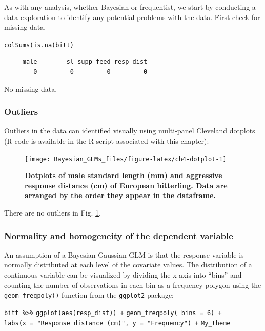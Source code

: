 \documentclass[
]{book}
\begin{document}
As with any analysis, whether Bayesian or frequentist, we start by conducting a data exploration to identify any potential problems with the data. First check for missing data.

\texttt{colSums(is.na(bitt)}

\begin{verbatim}
     male        sl supp_feed resp_dist 
        0         0         0         0 
\end{verbatim}

No missing data.

\hypertarget{outliers-1}{%
\subsubsection{Outliers}\label{outliers-1}}

Outliers in the data can identified visually using multi-panel Cleveland dotplots (R code is available in the R script associated with this chapter):



\begin{figure}

{\centering \texttt{[image: Bayesian\_GLMs\_files/figure-latex/ch4-dotplot-1]} 

}

\caption{\textbf{Dotplots of male standard length (mm) and aggressive response distance (cm) of European bitterling. Data are arranged by the order they appear in the dataframe.}}\label{fig:ch4-dotplot}
\end{figure}

There are no outliers in Fig. \ref{fig:ch4-dotplot}.

\hypertarget{normality-and-homogeneity-of-the-dependent-variable-1}{%
\subsubsection{Normality and homogeneity of the dependent variable}\label{normality-and-homogeneity-of-the-dependent-variable-1}}

An assumption of a Bayesian Gaussian GLM is that the response variable is normally distributed at each level of the covariate values. The distribution of a continuous variable can be visualized by dividing the x-axis into ``bins'' and counting the number of observations in each bin as a frequency polygon using the \texttt{geom\_freqpoly()} function from the \texttt{ggplot2} package:

\texttt{bitt\ \%\textgreater{}\%\textquotesingle{}}
\texttt{ggplot(aes(resp\_dist))\ +}
\texttt{geom\_freqpoly(\ bins\ =\ 6)\ +}
\texttt{labs(x\ =\ "Response\ distance\ (cm)",\ y\ =\ "Frequency")\ +}
\texttt{My\_theme}
\end{document}
